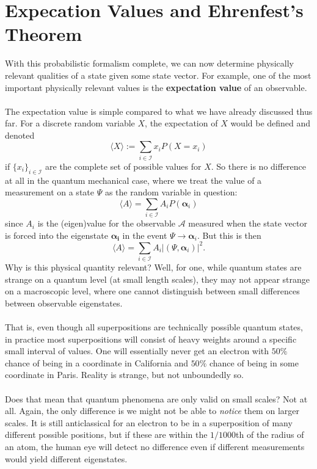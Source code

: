 \section{Expecation Values and Ehrenfest's Theorem}
With this probabilistic formalism complete, we can now determine physically relevant qualities of a state given some state vector. For example, one of the most important physically relevant values is the \textbf{expectation value} of an observable.
\\\\
The expectation value is simple compared to what we have already discussed thus far. For a discrete random variable $X$, the expectation of $X$ would be defined and denoted
$$
\langle X \rangle := \sum_{{i\in \mathcal{I}}}x_{i}P(X=x_{i})
$$
if $\{x_{i}\}_{i\in \mathcal{I}}$ are the complete set of possible values for $X$. So there is no difference at all in the quantum mechanical case, where we treat the value of a measurement on a state $\Psi$ as the random variable in question:
$$
\langle A \rangle = \sum_{i\in\mathcal{I}}A_{i}P(\bm{\alpha}_{i})
$$
since $A_{i}$ is the (eigen)value for the observable $\mathcal{A}$ measured when the state vector is forced into the eigenstate $\bm{\alpha_{i}}$ in the event $\Psi \to \bm{\alpha}_{i}$. But this is then 
$$
\langle A \rangle = \sum_{i\in\mathcal{I}}A_{i}|(\Psi,\bm{\alpha}_{i})|^{2}.
$$
Why is this physical quantity relevant? Well, for one, while quantum states are strange on a quantum level (at small length scales), they may not appear strange on a macroscopic level, where one cannot distinguish between small differences between observable eigenstates.
\\\\
That is, even though all superpositions are technically possible quantum states, in practice most superpositions will consist of heavy weights around a specific small interval of values. One will essentially never get an electron with $50\%$ chance of being in a coordinate in California and $50\%$ chance of being in some coordinate in Paris. Reality is strange, but not unboundedly so.
\\\\
Does that mean that quantum phenomena are only valid on small scales? Not at all. Again, the only difference is we might not be able to \textit{notice} them on larger scales. It is still anticlassical for an electron to be in a superposition of many different possible positions, but if these are within the $1/1000$th of the radius of an atom, the human eye will detect no difference even if different measurements would yield different eigenstates.
